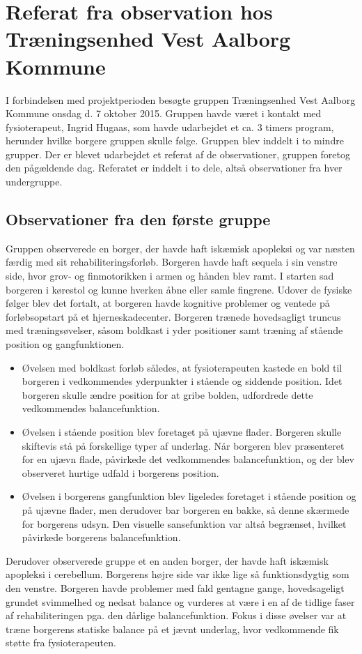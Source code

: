 \chapter{Referat fra observation hos Træningsenhed Vest Aalborg Kommune}\label{Ref_observation}
I forbindelsen med projektperioden besøgte gruppen Træningsenhed Vest Aalborg Kommune onsdag d. 7 oktober 2015. Gruppen havde været i kontakt med fysioterapeut, Ingrid Hugaas, som havde udarbejdet et ca. 3 timers program, herunder hvilke borgere gruppen skulle følge. Gruppen blev inddelt i to mindre grupper. Der er blevet udarbejdet et referat af de observationer, gruppen foretog den pågældende dag. Referatet er inddelt i to dele, altså observationer fra hver undergruppe. 

\section{Observationer fra den første gruppe}
Gruppen observerede en borger, der havde haft iskæmisk apopleksi og var næsten færdig med sit rehabiliteringsforløb. Borgeren havde haft sequela  i sin venstre side, hvor grov- og finmotorikken i armen og hånden blev ramt. I starten sad borgeren i kørestol og kunne hverken åbne eller samle fingrene. Udover de fysiske følger blev det fortalt, at borgeren havde kognitive problemer og ventede på forløbsopstart på et hjerneskadecenter. Borgeren trænede hovedsagligt truncus med træningsøvelser, såsom boldkast i yder positioner samt træning af stående position og gangfunktionen. 
\begin{itemize}
\item Øvelsen med boldkast forløb således, at fysioterapeuten kastede en bold til borgeren i vedkommendes yderpunkter i stående og siddende position. Idet borgeren skulle ændre position for at gribe bolden, udfordrede dette vedkommendes balancefunktion. 
\item Øvelsen i stående position blev foretaget på ujævne flader. Borgeren skulle skiftevis stå på forskellige typer af underlag. Når borgeren blev præsenteret for en ujævn flade, påvirkede det vedkommendes balancefunktion, og der blev observeret hurtige udfald i borgerens position. 
\item Øvelsen i borgerens gangfunktion blev ligeledes foretaget i stående position og på ujævne flader, men derudover bar borgeren en bakke, så denne skærmede for borgerens udsyn. Den visuelle sansefunktion var altså begrænset, hvilket påvirkede borgerens balancefunktion. 
\end{itemize}
\noindent Derudover observerede gruppe et en anden borger, der havde haft iskæmisk apopleksi i cerebellum. Borgerens højre side var ikke lige så funktionsdygtig som den venstre. Borgeren havde problemer med fald gentagne gange, hovedsageligt grundet svimmelhed og nedsat balance og vurderes at være i en af de tidlige faser af rehabiliteringen pga. den dårlige balancefunktion. Fokus i disse øvelser var at træne borgerens statiske balance på et jævnt underlag, hvor vedkommende fik støtte fra fysioterapeuten. 

